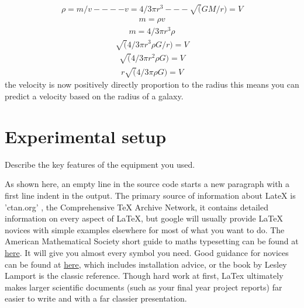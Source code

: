 \documentclass[10pt, twocolumn, twoside]{article}
\begin{document}
\begin{equation*}
\label{GaussE}
\begin{aligned}
\rho= m/v----v=4/3\pi r^3---\sqrt(GM/r)=V
\end{aligned}
\end{equation*}
\begin{equation*}
\label{GaussE}
\begin{aligned}
 m=\rho v
\end{aligned}
\end{equation*}
\begin{equation*}
\label{GaussE}
\begin{aligned}
 m= 4/3\pi r^3\rho
\end{aligned}
\end{equation*}
\begin{equation*}
\label{GaussE}
\begin{aligned}
\sqrt(4/3\pi r^3\rho G/r)=V
\end{aligned}
\end{equation*}
\begin{equation*}
\label{GaussE}
\begin{aligned}
\sqrt(4/3\pi r^2\rho G)=V
\end{aligned}
\end{equation*}
\begin{equation*}
\label{GaussE}
\begin{aligned}
r\sqrt(4/3\pi \rho G)=V
\end{aligned}
\end{equation*}
the velocity is now positively directly proportion to the radius
this means you can predict a velocity based on the radius of a galaxy.





\section{Experimental setup}
Describe the key features of the equipment you used. 

As shown here, an empty line in the source code starts a new paragraph with a first line indent in the output. The primary source of information about LateX is 'ctan.org' , the Comprehensive TeX Archive Network, it contains detailed information on every aspect of LaTeX, but google will usually provide LaTeX novices with simple examples elsewhere for most of what you want to do. The American Mathematical Society short guide to maths typesetting can be found at \href{<ftp://ftp.ams.org/pub/tex/doc/amsmath/short-math-guide.pdf>}{here}. It will give you almost every symbol you need. Good guidance for novices can be found at \href{<https://en.m.wikibooks.org/wiki/LaTeX/Basics>}{here}, which includes installation advice, or the book by Lesley Lamport is the classic reference. Though hard work at first, LaTex ultimately makes larger scientific documents (such as your final year project reports) far easier to write and with a far classier presentation.
\end{document}
